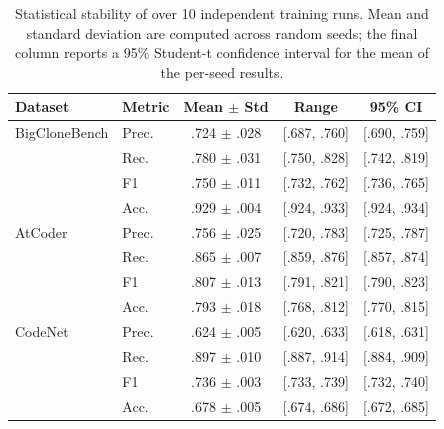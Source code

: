 \begin{table}[!htbp]
\centering
\caption{Statistical stability of \method{} over 10 independent
training runs. Mean and standard deviation are computed across random seeds; the final column reports a 95\% Student-t confidence interval for the mean of the per-seed results.}
\label{tab:d3_stability}

\scriptsize
\setlength{\tabcolsep}{4.2pt}
\renewcommand{\arraystretch}{1.08}

\begin{tabular}{@{}llccc@{}}
\toprule
\textbf{Dataset}
& \textbf{Metric}
& \textbf{Mean $\pm$ Std}
& \textbf{Range}
& \textbf{95\% CI} \\
\midrule

BigCloneBench
& Prec.
& .724 $\pm$ .028
& [.687, .760]
& [.690, .759] \\

& Rec.
& .780 $\pm$ .031
& [.750, .828]
& [.742, .819] \\

& F1
& .750 $\pm$ .011
& [.732, .762]
& [.736, .765] \\

& Acc.
& .929 $\pm$ .004
& [.924, .933]
& [.924, .934] \\

\midrule
AtCoder
& Prec.
& .756 $\pm$ .025
& [.720, .783]
& [.725, .787] \\

& Rec.
& .865 $\pm$ .007
& [.859, .876]
& [.857, .874] \\

& F1
& .807 $\pm$ .013
& [.791, .821]
& [.790, .823] \\

& Acc.
& .793 $\pm$ .018
& [.768, .812]
& [.770, .815] \\

\midrule
CodeNet
& Prec.
& .624 $\pm$ .005
& [.620, .633]
& [.618, .631] \\

& Rec.
& .897 $\pm$ .010
& [.887, .914]
& [.884, .909] \\

& F1
& .736 $\pm$ .003
& [.733, .739]
& [.732, .740] \\

& Acc.
& .678 $\pm$ .005
& [.674, .686]
& [.672, .685] \\

\bottomrule
\end{tabular}
\end{table}
